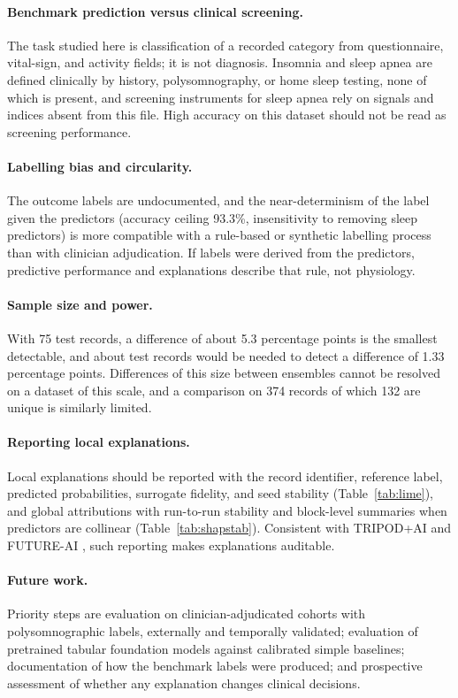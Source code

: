 \documentclass[a4paper,fleqn]{cas-dc}
\begin{document}
\paragraph{Benchmark prediction versus clinical screening.} The task studied here is classification of a recorded category from questionnaire, vital-sign, and activity fields; it is not diagnosis. Insomnia and sleep apnea are defined clinically by history, polysomnography, or home sleep testing, none of which is present, and screening instruments for sleep apnea rely on signals and indices absent from this file. High accuracy on this dataset should not be read as screening performance.

\paragraph{Labelling bias and circularity.} The outcome labels are undocumented, and the near-determinism of the label given the predictors (accuracy ceiling 93.3\%, insensitivity to removing sleep predictors) is more compatible with a rule-based or synthetic labelling process than with clinician adjudication. If labels were derived from the predictors, predictive performance and explanations describe that rule, not physiology.

\paragraph{Sample size and power.} With 75 test records, a difference of about 5.3 percentage points is the smallest detectable, and about \NReq{} test records would be needed to detect a difference of 1.33 percentage points. Differences of this size between ensembles cannot be resolved on a dataset of this scale, and a comparison on 374 records of which 132 are unique is similarly limited.

\paragraph{Reporting local explanations.} Local explanations should be reported with the record identifier, reference label, predicted probabilities, surrogate fidelity, and seed stability (Table~\ref{tab:lime}), and global attributions with run-to-run stability and block-level summaries when predictors are collinear (Table~\ref{tab:shapstab}). Consistent with TRIPOD+AI \cite{tripodai2024} and FUTURE-AI \cite{futureai2025}, such reporting makes explanations auditable.

\paragraph{Future work.} Priority steps are evaluation on clinician-adjudicated cohorts with polysomnographic labels, externally and temporally validated; evaluation of pretrained tabular foundation models against calibrated simple baselines; documentation of how the benchmark labels were produced; and prospective assessment of whether any explanation changes clinical decisions.
\end{document}
